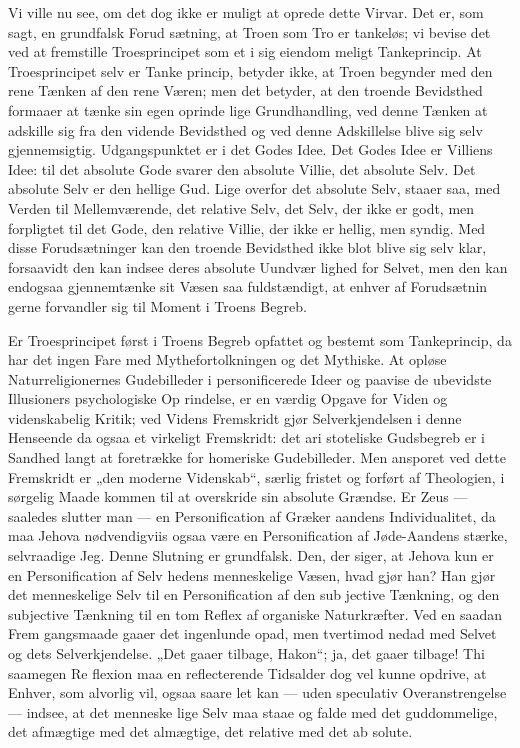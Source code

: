 \documentclass[12pt]{book}
\newcommand{\opage}[1]{\marginnote{\footnotesize\textit{[#1]}}}
\begin{document}
Vi ville nu see, om det dog ikke er muligt at oprede
dette Virvar. Det er, som sagt, en grundfalsk Forud\-%
sætning, at Troen som Tro er tankeløs; vi bevise det
ved at fremstille Troesprincipet som et i sig eiendom\-%
meligt Tankeprincip. At Troesprincipet selv er Tanke\-%
princip, betyder ikke, at Troen begynder med den rene
Tænken af den rene Væren; men det betyder, at den
troende Bevidsthed formaaer at tænke sin egen oprinde\-%
lige Grundhandling, ved denne Tænken at adskille sig
fra den vidende Bevidsthed og ved denne Adskillelse
blive sig selv gjennemsigtig. Udgangspunktet er i det
Godes Idee. Det Godes Idee er Villiens Idee: til det
absolute Gode svarer den absolute Villie, det absolute
Selv. Det absolute Selv er den hellige Gud. Lige\-%
overfor det absolute Selv, staaer saa, med Verden til
Mellemværende, det relative Selv, det Selv, der ikke er
godt, men forpligtet til det Gode, den relative Villie, der
ikke er hellig, men syndig. Med disse Forudsætninger
kan den troende Bevidsthed ikke blot blive sig selv
\opage{102}\setcounter{footnote}{0}%
klar, forsaavidt den kan indsee deres absolute Uundvær\-%
lighed for Selvet, men den kan endogsaa gjennemtænke
sit Væsen saa fuldstændigt, at enhver af Forudsætnin\-%
gerne forvandler sig til Moment i Troens Begreb.

Er Troesprincipet først i Troens Begreb opfattet
og bestemt som Tankeprincip, da har det ingen Fare
med Mythefortolkningen og det Mythiske. At opløse
Naturreligionernes Gudebilleder i personificerede Ideer %
og paavise de ubevidste Illusioners psychologiske Op\-%
rindelse, er en værdig Opgave for Viden og videnskabelig
Kritik; ved Videns Fremskridt gjør Selverkjendelsen i
denne Henseende da ogsaa et virkeligt Fremskridt: det ari\-%
stoteliske Gudsbegreb er i Sandhed langt at foretrække
for homeriske Gudebilleder. Men ansporet ved dette
Fremskridt er „den moderne Videnskab“, særlig fristet
og forført af Theologien, i sørgelig Maade kommen
til at overskride sin absolute Grændse. Er Zeus ---
saaledes slutter man --- en Personification af Græker\-%
aandens Individualitet, da maa Jehova nødvendigviis
ogsaa være en Personification af Jøde-Aandens stærke,
selvraadige Jeg. Denne Slutning er grundfalsk. Den,
der siger, at Jehova kun er en Personification af Selv\-%
hedens menneskelige Væsen, hvad gjør han? Han gjør
det menneskelige Selv til en Personification af den sub\-%
jective Tænkning, og den subjective Tænkning til en tom
Reflex af organiske Naturkræfter. Ved en saadan Frem\-%
gangsmaade gaaer det ingenlunde opad, men tvertimod
nedad med Selvet og dets Selverkjendelse. „Det gaaer
tilbage, Hakon“; ja, det gaaer tilbage! Thi saamegen Re\-%
flexion maa en reflecterende Tidsalder dog vel kunne opdrive,
at Enhver, som alvorlig vil, ogsaa saare let kan --- uden
speculativ Overanstrengelse --- indsee, at det menneske\-%
lige Selv maa staae og falde med det guddommelige, det
\opage{103}\setcounter{footnote}{0}%
afmægtige med det almægtige, det relative med det ab\-%
solute.
\end{document}
